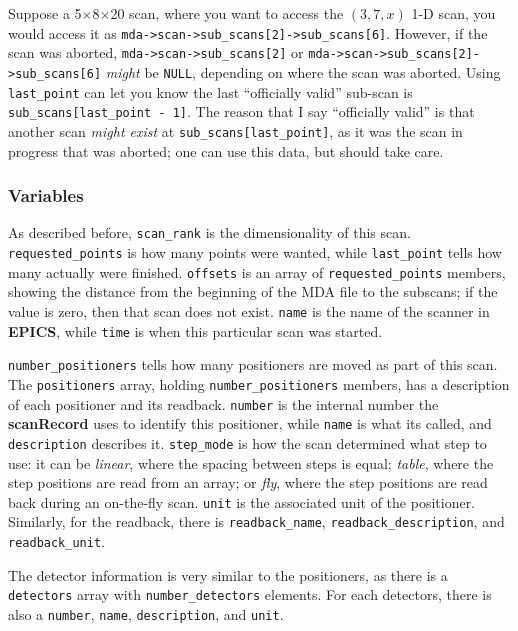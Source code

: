 \documentclass[10pt,letterpaper]{article}
\begin{document}
Suppose a 5$\times$8$\times$20 scan, where you want to access the
$(3,7,x)$ 1-D scan, you would access it as
\verb+mda->scan->sub_scans[2]->sub_scans[6]+.  However, if the scan
was aborted, \verb+mda->scan->sub_scans[2]+ or
\verb+mda->scan->sub_scans[2]->sub_scans[6]+ \textit{might} be
\verb+NULL+, depending on where the scan was aborted.  Using
\verb+last_point+ can let you know the last ``officially valid''
sub-scan is \verb+sub_scans[last_point - 1]+.  The reason that I say
``officially valid'' is that another scan \textit{might exist} at
\verb+sub_scans[last_point]+, as it was the scan in progress that was
aborted; one can use this data, but should take care.

\subsubsection{Variables}
\label{scan_variables}

As described before, \verb+scan_rank+ is the dimensionality of this
scan.  \verb+requested_points+ is how many points were wanted, while
\verb+last_point+ tells how many actually were finished.
\verb+offsets+ is an array of \verb+requested_points+ members, showing
the distance from the beginning of the MDA file to the subscans; if
the value is zero, then that scan does not exist.  \verb+name+ is the
name of the scanner in \textbf{EPICS}, while \verb+time+ is when this
particular scan was started.

\verb+number_positioners+ tells how many positioners are moved as part
of this scan.  The \verb+positioners+ array, holding
\verb+number_positioners+ members, has a description of each
positioner and its readback.  \verb+number+ is the internal number the
\textbf{scanRecord} uses to identify this positioner, while
\verb+name+ is what its called, and \verb+description+ describes it.
\verb+step_mode+ is how the scan determined what step to use: it can
be \textsl{linear}, where the spacing between steps is equal;
\textsl{table}, where the step positions are read from an array; or
\textsl{fly}, where the step positions are read back during an
on-the-fly scan. \verb+unit+ is the associated unit of the positioner.
Similarly, for the readback, there is \verb+readback_name+,
\verb+readback_description+, and \verb+readback_unit+.

The detector information is very similar to the positioners, as there
is a \verb+detectors+ array with \verb+number_detectors+ elements.
For each detectors, there is also a \verb+number+, \verb+name+,
\verb+description+, and \verb+unit+.
\end{document}
